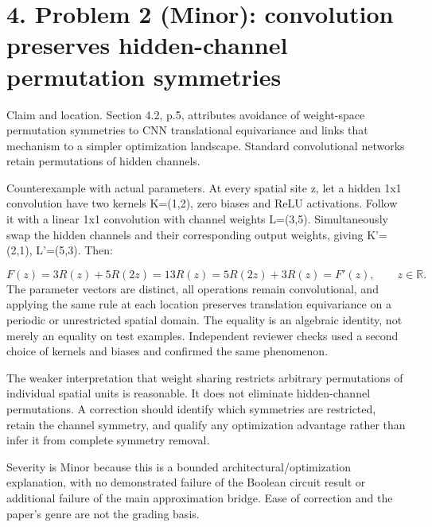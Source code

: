 \documentclass[10pt]{article}
\begin{document}
\section*{4. Problem 2 (Minor): convolution preserves hidden-channel permutation symmetries}
Claim and location. Section 4.2, p.5, attributes avoidance of weight-space permutation symmetries to CNN translational equivariance and links that mechanism to a simpler optimization landscape. Standard convolutional networks retain permutations of hidden channels.\par
Counterexample with actual parameters. At every spatial site z, let a hidden 1x1 convolution have two kernels K=(1,2), zero biases and ReLU activations. Follow it with a linear 1x1 convolution with channel weights L=(3,5). Simultaneously swap the hidden channels and their corresponding output weights, giving K’=(2,1), L’=(5,3). Then:\par
\[F(z)=3R(z)+5R(2z)=13R(z)
=5R(2z)+3R(z)=F'(z),\qquad z\in\mathbb{R}.\] The parameter vectors are distinct, all operations remain convolutional, and applying the same rule at each location preserves translation equivariance on a periodic or unrestricted spatial domain. The equality is an algebraic identity, not merely an equality on test examples. Independent reviewer checks used a second choice of kernels and biases and confirmed the same phenomenon.\par
The weaker interpretation that weight sharing restricts arbitrary permutations of individual spatial units is reasonable. It does not eliminate hidden-channel permutations. A correction should identify which symmetries are restricted, retain the channel symmetry, and qualify any optimization advantage rather than infer it from complete symmetry removal.\par
Severity is Minor because this is a bounded architectural/optimization explanation, with no demonstrated failure of the Boolean circuit result or additional failure of the main approximation bridge. Ease of correction and the paper’s genre are not the grading basis.\par
\end{document}
